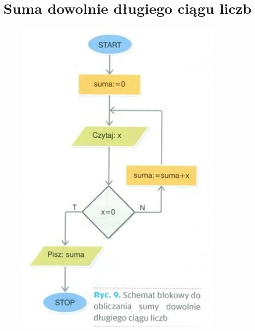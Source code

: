 \documentclass[a4paper,11pt]{article}
\begin{document}
\section{Suma dowolnie długiego ciągu liczb}
\begin{figure}[ht]
\centering
\includegraphics[height=16cm]{rys8}
\end{figure}
\newpage
\end{document}
